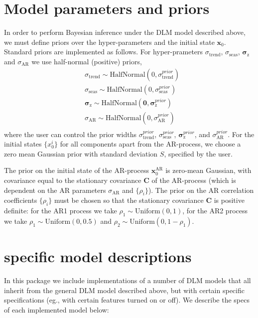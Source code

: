 \documentclass[a4paper, oneside, final]{scrartcl}
\begin{document}
\section{Model parameters and priors}
%
In order to perform Bayesian inference under the DLM model described above, we must define priors over the hyper-parameters and the
initial state $\mathbf{x}_0$. Standard priors are implemented as follows. For hyper-prameters $\sigma_\mathrm{trend}$, $\sigma_\mathrm{seas}$, $\boldsymbol\sigma_\mathrm{z}$ and $\sigma_\mathrm{AR}$ we use half-normal (positive) priors,
\begin{align}
&\sigma_\mathrm{trend} \sim \mathrm{HalfNormal}(0, \sigma_\mathrm{trend}^{prior}) \nonumber \\
&\sigma_\mathrm{seas} \sim \mathrm{HalfNormal}(0, \sigma_\mathrm{seas}^{prior}) \nonumber \\
&\boldsymbol{\sigma}_\mathrm{z} \sim \mathrm{HalfNormal}(\mathbf{0}, \boldsymbol{\sigma}_\mathrm{z}^{prior}) \nonumber \\
&\sigma_\mathrm{AR} \sim \mathrm{HalfNormal}(0, \sigma_\mathrm{AR}^{prior}) \nonumber \\
\end{align}
where the user can control the prior widths $\sigma_\mathrm{trend}^{prior}$, $\sigma_\mathrm{seas}^{prior}$, $\boldsymbol{\sigma}_\mathrm{z}^{prior}$, and $\sigma_\mathrm{AR}^{prior}$. For the initial states $\{x^i_0\}$ for all components apart from the AR-process, we choose a zero mean Gaussian prior with standard deviation $S$, specified by the user.

The prior on the initial state of the AR-process $\mathbf{x}_0^\mathrm{AR}$ is zero-mean Gaussian, with covariance equal to the stationary covariance $\mathbf{C}$ of the AR-process (which is dependent on the AR parameters $\sigma_\mathrm{AR}$ and $\{\rho_i\}$). The prior on the AR correlation coefficients $\{\rho_i\}$ must be chosen so that the stationary covariance $\mathbf{C}$ is positive definite: for the AR1 process we take $\rho_1\sim \mathrm{Uniform}(0, 1)$, for the AR2 process we take $\rho_1\sim \mathrm{Uniform}(0, 0.5)$ and $\rho_2\sim \mathrm{Uniform}(0, 1-\rho_1)$.
%
\section{specific model descriptions}
%
In this package we include implementations of a number of DLM models that all inherit from the general DLM model described above, but with certain specific specifications (eg., with certain features turned on or off). We describe the specs of each implemented model below:
%
\end{document}
